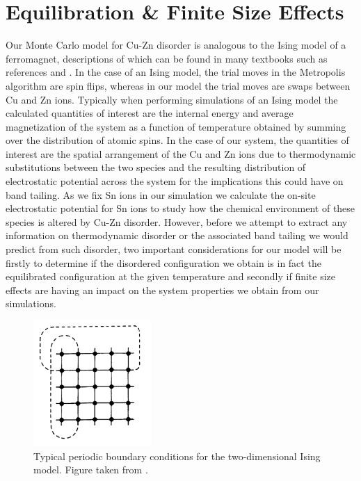 \section{Equilibration \& Finite Size Effects}\label{equilibration}
Our Monte Carlo model for Cu-Zn disorder is analogous to the Ising model of a ferromagnet, descriptions of which can be found in many textbooks such as references  and . In the case of an Ising model, the trial moves in the Metropolis algorithm are spin flips, whereas in our model the trial moves are swaps between Cu and Zn ions. Typically when performing simulations of an Ising model the calculated quantities of interest are the internal energy and average magnetization of the system as a function of temperature obtained by summing over the distribution of atomic spins. In the case of our system, the quantities of interest are the spatial arrangement of the Cu and Zn ions due to thermodynamic substitutions between the two species and the resulting distribution of electrostatic potential across the system for the implications this could have on band tailing. As we fix Sn ions in our simulation we calculate the on-site electrostatic potential for Sn ions to study how the chemical environment of these species is altered by Cu-Zn disorder.
However, before we attempt to extract any information on thermodynamic disorder or the associated band tailing we would predict from such disorder, two important considerations for our model will be firstly to determine if the disordered configuration we obtain is in fact the equilibrated configuration at the given temperature and secondly if finite size effects are having an impact on the system properties we obtain from our simulations.

\begin{figure}[h!]
  \centering
    \includegraphics[width=0.4\textwidth]{figures/MC_PBCs.png}
    \caption{Typical periodic boundary conditions for the two-dimensional Ising model. Figure taken from .}
  \label{MC_PBCs}
\end{figure}

